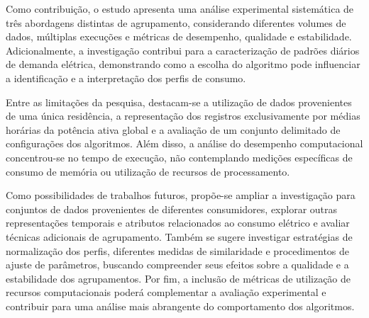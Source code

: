 \documentclass[lettersize,journal]{IEEEtran}
\begin{document}
Como contribuição, o estudo apresenta uma análise experimental sistemática de três abordagens distintas de agrupamento, considerando diferentes volumes de dados, múltiplas execuções e métricas de desempenho, qualidade e estabilidade. Adicionalmente, a investigação contribui para a caracterização de padrões diários de demanda elétrica, demonstrando como a escolha do algoritmo pode influenciar a identificação e a interpretação dos perfis de consumo.

Entre as limitações da pesquisa, destacam-se a utilização de dados provenientes de uma única residência, a representação dos registros exclusivamente por médias horárias da potência ativa global e a avaliação de um conjunto delimitado de configurações dos algoritmos. Além disso, a análise do desempenho computacional concentrou-se no tempo de execução, não contemplando medições específicas de consumo de memória ou utilização de recursos de processamento.

Como possibilidades de trabalhos futuros, propõe-se ampliar a investigação para conjuntos de dados provenientes de diferentes consumidores, explorar outras representações temporais e atributos relacionados ao consumo elétrico e avaliar técnicas adicionais de agrupamento. Também se sugere investigar estratégias de normalização dos perfis, diferentes medidas de similaridade e procedimentos de ajuste de parâmetros, buscando compreender seus efeitos sobre a qualidade e a estabilidade dos agrupamentos. Por fim, a inclusão de métricas de utilização de recursos computacionais poderá complementar a avaliação experimental e contribuir para uma análise mais abrangente do comportamento dos algoritmos.





\end{document}
